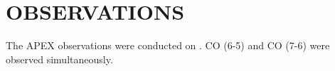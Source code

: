 \section{OBSERVATIONS}

The APEX observations were conducted on . CO (6-5) and CO (7-6) were observed simultaneously. 
